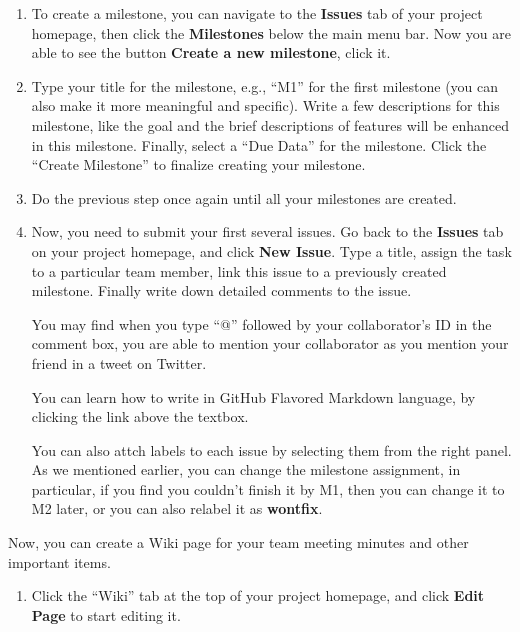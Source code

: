 \begin{enumerate}

\item To create a milestone, you can navigate to the \textbf{Issues} tab of your
project homepage, then click the \textbf{Milestones} below the main menu bar.
Now you are able to see the button \textbf{Create a new milestone}, click it.

\item Type your title for the milestone, e.g., ``M1'' for the first milestone
(you can also make it more meaningful and specific). Write a few descriptions
for this milestone, like the goal and the brief descriptions of features will be
enhanced in this milestone. Finally, select a ``Due Data'' for the milestone.
Click the ``Create Milestone'' to finalize creating your milestone.

\item Do the previous step once again until all your milestones are created.

\item Now, you need to submit your first several issues. Go back to the
\textbf{Issues} tab on your project homepage, and click \textbf{New Issue}. Type
a title, assign the task to a particular team member, link this issue to a
previously created milestone. Finally write down detailed comments to the issue.

You may find when you type ``@'' followed by your collaborator's ID in the
comment box, you are able to mention your collaborator as you mention your
friend in a tweet on Twitter.

You can learn how to write in GitHub Flavored Markdown language, by clicking the
link above the textbox.

You can also attch labels to each issue by selecting them from the right panel.
As we mentioned earlier, you can change the milestone assignment, in particular,
if you find you couldn't finish it by M1, then you can change it to M2 later, or
you can also relabel it as \textbf{wontfix}.

\end{enumerate}

Now, you can create a Wiki page for your team meeting minutes and other
important items.

\begin{enumerate}

\item Click the ``Wiki'' tab at the top of your project homepage, and click
\textbf{Edit Page} to start editing it.

\end{enumerate}

